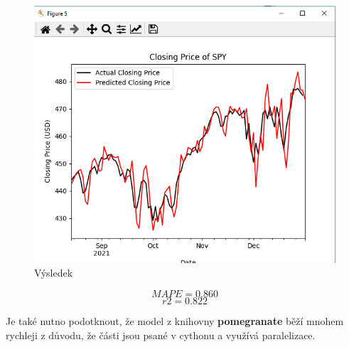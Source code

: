 \begin{figure}[h]
    \includegraphics[width=1\textwidth]{img/pomegranate}
    \caption{Výsledek}
    \label{fig:pomegranate}
\end{figure}

\[MAPE = 0.860\]
\[r2 = 0.822\]

Je také nutno podotknout, že model z knihovny \textbf{pomegranate} běží mnohem rychleji z důvodu, že části jsou psané v cythonu a využívá paralelizace.

\clearpage
